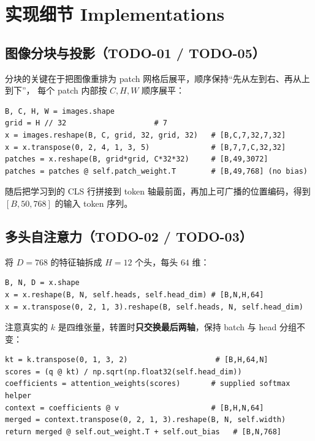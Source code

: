 \documentclass[a4paper,12pt]{article}
\begin{document}
\section{实现细节 Implementations}

\subsection{图像分块与投影（TODO-01 / TODO-05）}

分块的关键在于把图像重排为 patch 网格后展平，顺序保持“先从左到右、再从上到下”，
每个 patch 内部按 $C,H,W$ 顺序展平：

\begin{lstlisting}
B, C, H, W = images.shape
grid = H // 32                    # 7
x = images.reshape(B, C, grid, 32, grid, 32)   # [B,C,7,32,7,32]
x = x.transpose(0, 2, 4, 1, 3, 5)              # [B,7,7,C,32,32]
patches = x.reshape(B, grid*grid, C*32*32)     # [B,49,3072]
patches = patches @ self.patch_weight.T        # [B,49,768] (no bias)
\end{lstlisting}

随后把学习到的 CLS 行拼接到 token 轴最前面，再加上可广播的位置编码，得到
$[B,50,768]$ 的输入 token 序列。

\subsection{多头自注意力（TODO-02 / TODO-03）}

将 $D=768$ 的特征轴拆成 $H=12$ 个头，每头 $64$ 维：

\begin{lstlisting}
B, N, D = x.shape
x = x.reshape(B, N, self.heads, self.head_dim) # [B,N,H,64]
x = x.transpose(0, 2, 1, 3).reshape(B, self.heads, N, self.head_dim)
\end{lstlisting}

注意真实的 $k$ 是四维张量，转置时\textbf{只交换最后两轴}，保持 batch 与 head 分组不变：

\begin{lstlisting}
kt = k.transpose(0, 1, 3, 2)                    # [B,H,64,N]
scores = (q @ kt) / np.sqrt(np.float32(self.head_dim))
coefficients = attention_weights(scores)       # supplied softmax helper
context = coefficients @ v                     # [B,H,N,64]
merged = context.transpose(0, 2, 1, 3).reshape(B, N, self.width)
return merged @ self.out_weight.T + self.out_bias   # [B,N,768]
\end{lstlisting}
\end{document}

